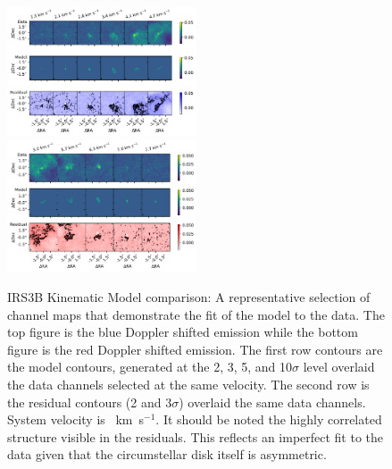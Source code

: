\begin{figure}[H]
\begin{center}
\includegraphics[width=0.5\textwidth]{img/Channelplot_irs3bplotblue_C17O.pdf}
\includegraphics[width=0.5\textwidth]{img/Channelplot_irs3bplotred_C17O.pdf}
\end{center}
\caption{IRS3B Kinematic Model comparison: A representative selection of channel maps that demonstrate the fit of the model to the data. The top figure is the blue Doppler shifted emission while the bottom figure is the red Doppler shifted emission. The first row contours are the model contours, generated at the 2, 3, 5, and 10$\sigma$ level overlaid the data channels selected at the same velocity. The second row is the residual contours (2 and 3$\sigma$) overlaid the same data channels. System velocity is ~km~s$^{-1}$. It should be noted the highly correlated structure visible in the residuals. This reflects an imperfect fit to the data given that the circumstellar disk itself is asymmetric.}\label{fig:c17o_res}
\end{figure}


